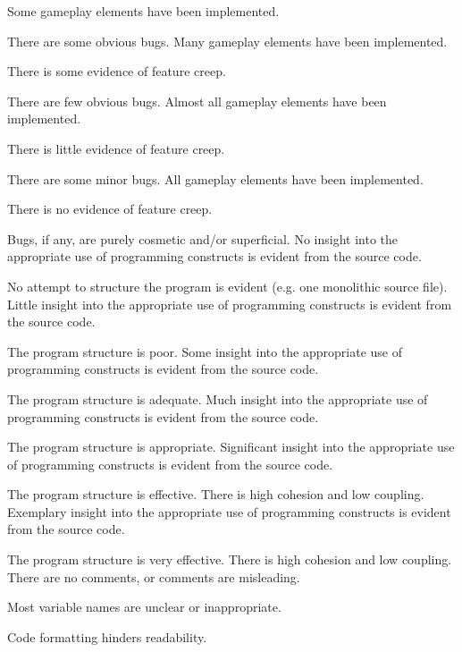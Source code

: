 \documentclass{../fal_assignment}
\begin{document}
\begin{markingrubric}
        \grade Some gameplay elements have been implemented.
            \par There are some obvious bugs.
        \grade Many gameplay elements have been implemented.
            \par There is some evidence of feature creep.
            \par There are few obvious bugs.
        \grade Almost all gameplay elements have been implemented.
            \par There is little evidence of feature creep.
            \par There are some minor bugs.
        \grade All gameplay elements have been implemented.
            \par There is no evidence of feature creep.
            \par Bugs, if any, are purely cosmetic and/or superficial.
        \grade\fail No insight into the appropriate use of programming constructs is evident from the source code.
            \par No attempt to structure the program is evident (e.g. one monolithic source file).
        \grade Little insight into the appropriate use of programming constructs is evident from the source code.
            \par The program structure is poor.
        \grade Some insight into the appropriate use of programming constructs is evident from the source code.
            \par The program structure is adequate.
        \grade Much insight into the appropriate use of programming constructs is evident from the source code.
            \par The program structure is appropriate.
        \grade Significant insight into the appropriate use of programming constructs is evident from the source code.
            \par The program structure is effective. There is high cohesion and low coupling.
        \grade Exemplary insight into the appropriate use of programming constructs is evident from the source code.
            \par The program structure is very effective. There is high cohesion and low coupling.
        \grade\fail There are no comments, or comments are misleading.
            \par Most variable names are unclear or inappropriate.
            \par Code formatting hinders readability.

\end{markingrubric}
\end{document}
